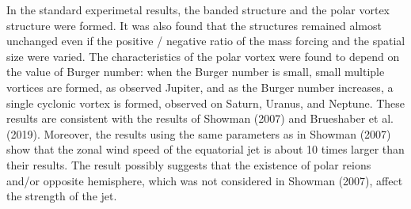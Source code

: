 \documentclass[a4j,12pt,openbib,oneside]{jreport}
\begin{document}
In the standard experimetal results, 
the banded structure and 
the polar vortex structure were formed.
%
It was also found that the structures remained almost unchanged 
even if the positive / negative 
ratio of the mass forcing and the spatial size were varied.
%
The characteristics of the polar vortex were 
found to depend on the value of Burger number:
when the Burger number is small, 
small multiple vortices are formed, as observed Jupiter,
and as the Burger number increases, 
a single cyclonic vortex is formed, observed on Saturn, Uranus, and Neptune.
%
These results are consistent with the results of Showman (2007) and Brueshaber et al. (2019).
%
Moreover, the results using the same parameters as in Showman (2007) show that 
the zonal wind speed of the equatorial jet is 
about 10 times larger than their results.
%
The result possibly suggests that the existence of polar reions and/or opposite hemisphere,
which was not considered in Showman (2007), affect the strength of the jet.
%


\end{document}

